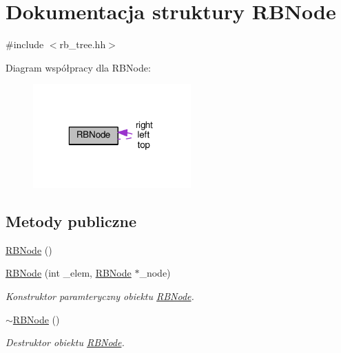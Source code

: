 \hypertarget{struct_r_b_node}{\section{Dokumentacja struktury R\-B\-Node}
\label{struct_r_b_node}
}


{\ttfamily \#include $<$rb\-\_\-tree.\-hh$>$}



Diagram współpracy dla R\-B\-Node\-:\nopagebreak
\begin{figure}[H]
\begin{center}
\leavevmode
\includegraphics[width=172pt]{struct_r_b_node__coll__graph}
\end{center}
\end{figure}
\subsection*{Metody publiczne}
\begin{DoxyCompactItemize}
\item 
\hyperlink{struct_r_b_node_a6c581adb50310ce3794f2e4613ac166c}{R\-B\-Node} ()
\item 
\hyperlink{struct_r_b_node_a47877ed34169ca5d7b4e7ea1ca702fbf}{R\-B\-Node} (int \-\_\-elem, \hyperlink{struct_r_b_node}{R\-B\-Node} $\ast$\-\_\-node)
\begin{DoxyCompactList}\small\item\em Konstruktor paramteryczny obiektu \hyperlink{struct_r_b_node}{R\-B\-Node}. \end{DoxyCompactList}\item 
\hyperlink{struct_r_b_node_aca1bb7761c39ebd05b9051314df10843}{$\sim$\-R\-B\-Node} ()
\begin{DoxyCompactList}\small\item\em Destruktor obiektu \hyperlink{struct_r_b_node}{R\-B\-Node}. \end{DoxyCompactList}\end{DoxyCompactItemize}
